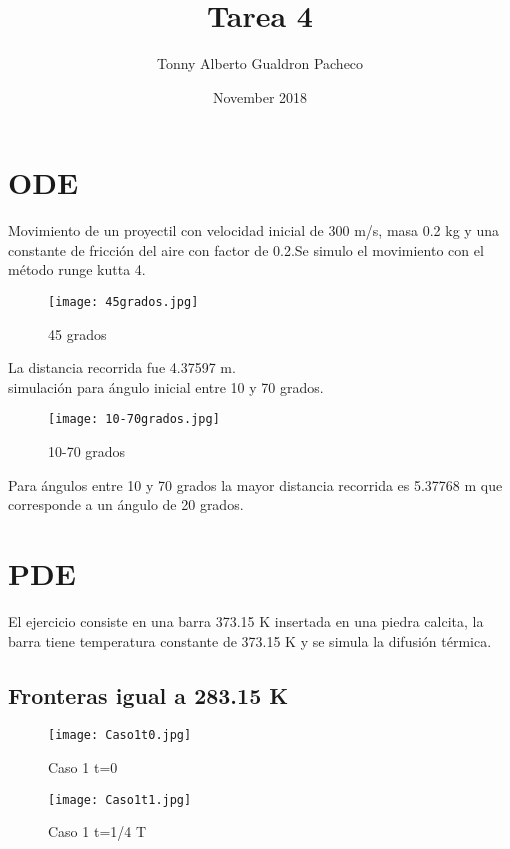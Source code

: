\documentclass{article}
\title{Tarea 4}
\author{Tonny Alberto Gualdron Pacheco}
\date{November 2018}
\begin{document}
\maketitle

\section{ODE}

Movimiento de un proyectil con velocidad inicial de 300 m/s, masa 0.2 kg y una constante de fricción del aire con factor de 0.2.Se simulo el movimiento con el método runge kutta 4.\\

\begin{figure}[h!]
\centering
\texttt{[image: 45grados.jpg]}
\caption{45 grados}
\label{fig:45}
\end{figure}

La distancia recorrida fue 4.37597 m.\\

simulación para ángulo inicial entre 10 y 70 grados.\\

\begin{figure}[h!]
\centering
\texttt{[image: 10-70grados.jpg]}
\caption{10-70 grados}
\label{fig:10-70}
\end{figure}

Para ángulos entre 10 y 70 grados la mayor distancia recorrida es 5.37768 m que corresponde a un ángulo de 20 grados.\\

\section{PDE}

El ejercicio consiste en una barra 373.15 K insertada en una piedra calcita, la barra tiene temperatura constante de 373.15 K y se simula la difusión térmica.\\ 

\subsection{Fronteras igual a 283.15 K}

\begin{figure}[h!]
\centering
\texttt{[image: Caso1t0.jpg]}
\caption{Caso 1 t=0}
\label{fig:1}
\end{figure}

\begin{figure}[h!]
\centering
\texttt{[image: Caso1t1.jpg]}
\caption{Caso 1 t=1/4 T}
\label{fig:2}
\end{figure}
\end{document}
